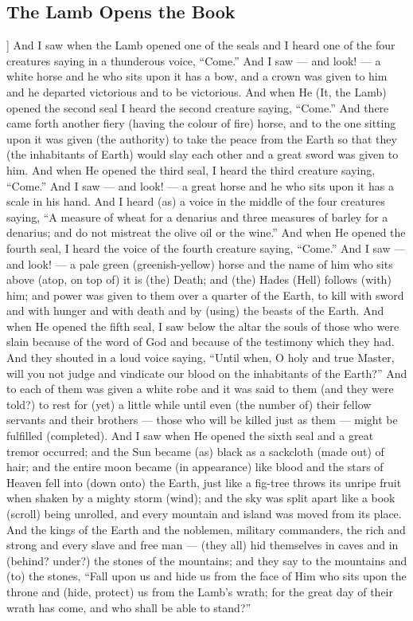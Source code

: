 \begin{pages}
\begin{Leftside}
        			\chapter{The Lamb Opens the Book}
				]
		And I saw when the Lamb opened one of the seals and I heard one of the four creatures saying in a thunderous voice, “Come.” And I saw — and look! — a white horse and he who sits upon it has a bow, and a crown was given to him and he departed victorious and to be victorious.
		\pend
		\pstart
		And when He (It, the Lamb) opened the second seal I heard the second creature saying, “Come.” And there came forth another fiery (having the colour of fire) horse, and to the one sitting upon it was given (the authority) to take the peace from the Earth so that they (the inhabitants of Earth) would slay each other and a great sword was given to him.
		\pend
		\pstart
		And when He opened the third seal, I heard the third creature saying, “Come.” And I saw — and look! — a great horse and he who sits upon it has a scale in his hand. And I heard (as) a voice in the middle of the four creatures saying, “A measure of wheat for a denarius and three measures of barley for a denarius; and do not mistreat the olive oil or the wine.”
		\pend
		\pstart
		And when He opened the fourth seal, I heard the voice of the fourth creature saying, “Come.” And I saw — and look! — a pale green (greenish-yellow) horse and the name of him who sits above (atop, on top of) it is (the) Death; and (the) Hades (Hell) follows (with) him; and power was given to them over a quarter of the Earth, to kill with sword and with hunger and with death and by (using) the beasts of the Earth.
		\pend
		\pstart
		And when He opened the fifth seal, I saw below the altar the souls of those who were slain because of the word of God and because of the testimony which they had. And they shouted in a loud voice saying, “Until when, O holy and true Master, will you not judge and vindicate our blood on the inhabitants of the Earth?” And to each of them was given a white robe and it was said to them (and they were told?) to rest for (yet) a little while until even (the number of) their fellow servants and their brothers — those who will be killed just as them — might be fulfilled (completed).
		\pend
		\pstart
		And I saw when He opened the sixth seal and a great tremor occurred; and the Sun became (as) black as a sackcloth (made out) of hair; and the entire moon became (in appearance) like blood and the stars of Heaven fell into (down onto) the Earth, just like a fig-tree throws its unripe fruit when shaken by a mighty storm (wind); and the sky was split apart like a book (scroll) being unrolled, and every mountain and island was moved from its place.
		\pend
		\pstart
		And the kings of the Earth and the noblemen, military commanders, the rich and strong and every slave and free man — (they all) hid themselves in caves and in (behind? under?) the stones of the mountains; and they say to the mountains and (to) the stones, “Fall upon us and hide us from the face of Him who sits upon the throne and (hide, protect) us from the Lamb’s wrath; for the great day of their wrath has come, and who shall be able to stand?”
		\pend
        \endnumbering
    \end{Leftside}


\end{pages}
